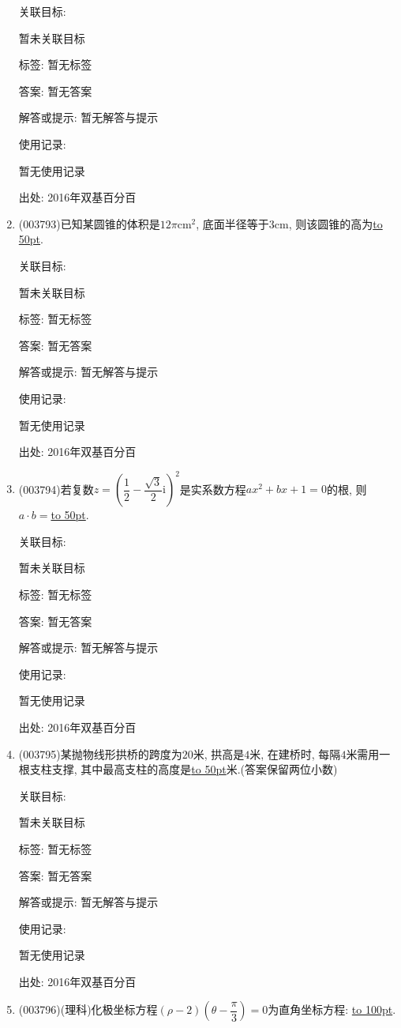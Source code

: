 \documentclass[10pt,a4paper]{article}
\newcommand{\blank}[1]{\underline{\hbox to #1pt{}}}
\begin{document}
\begin{enumerate}[1.]
关联目标:

暂未关联目标



标签: 暂无标签

答案: 暂无答案

解答或提示: 暂无解答与提示

使用记录:

暂无使用记录


出处: 2016年双基百分百
\item { (003793)}已知某圆锥的体积是$12\pi$cm$^2$, 底面半径等于$3$cm, 则该圆锥的高为\blank{50}.


关联目标:

暂未关联目标



标签: 暂无标签

答案: 暂无答案

解答或提示: 暂无解答与提示

使用记录:

暂无使用记录


出处: 2016年双基百分百
\item { (003794)}若复数$z=\left(\dfrac 12-\dfrac{\sqrt{3}}{2}\mathrm{i}\right)^2$是实系数方程$ax^2+bx+1=0$的根, 则$a\cdot b=$\blank{50}.


关联目标:

暂未关联目标



标签: 暂无标签

答案: 暂无答案

解答或提示: 暂无解答与提示

使用记录:

暂无使用记录


出处: 2016年双基百分百
\item { (003795)}某抛物线形拱桥的跨度为$20$米, 拱高是$4$米, 在建桥时, 每隔$4$米需用一根支柱支撑, 其中最高支柱的高度是\blank{50}米.(答案保留两位小数)


关联目标:

暂未关联目标



标签: 暂无标签

答案: 暂无答案

解答或提示: 暂无解答与提示

使用记录:

暂无使用记录


出处: 2016年双基百分百
\item { (003796)}(理科)化极坐标方程$(\rho-2)\left(\theta-\dfrac{\pi}{3}\right)=0$为直角坐标方程: \blank{100}.



\end{enumerate}
\end{document}
